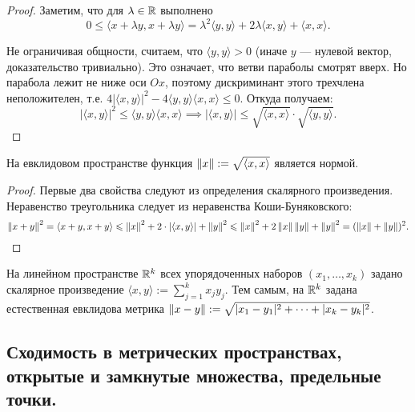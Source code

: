 \documentclass[a4paper]{article}
\theoremstyle{named}
\begin{document}
    \begin{proof}
        Заметим, что для $\lambda \in \mathbb{R}$ выполнено
        \begin{equation*}
            0 \leq \langle x + \lambda y, x + \lambda y \rangle = \lambda^2 \langle y, y \rangle + 2\lambda \langle x, y \rangle + \langle x, x \rangle.
        \end{equation*}

        Не ограничивая общности, считаем, что $\langle y, y \rangle > 0$ (иначе $y$ --- нулевой вектор, доказательство тривиально). Это означает, что ветви параболы смотрят вверх. Но парабола лежит не ниже оси $Ox$, поэтому дискриминант этого трехчлена неположителен, т.е. $4|\langle x, y \rangle|^2 - 4\langle y, y \rangle \langle x, x \rangle \leq 0$. Откуда получаем:
        \begin{equation*}
            |\langle x, y \rangle|^2 \leq \langle y, y \rangle \langle x, x \rangle \implies |\langle x, y \rangle| \leq \sqrt{\langle x, x \rangle} \cdot \sqrt{\langle y, y \rangle}.
        \end{equation*}
    \end{proof}

    \begin{consequence*}
        На евклидовом пространстве функция $\left\lVert x\right\rVert := \sqrt{\langle x, x \rangle}$ является нормой.
    \end{consequence*}

    \begin{proof}
        Первые два свойства следуют из определения скалярного произведения. Неравенство треугольника следует из неравенства Коши-Буняковского:
        \begin{equation*}
            \left\lVert x + y\right\rVert^2 = \langle x + y, x + y \rangle \leqslant \left\lVert x\right\rVert^2 + 2 \cdot |\langle x, y \rangle| + \left\lVert y\right\rVert^2 \leqslant \left\lVert x\right\rVert^2 + 2\left\lVert x\right\rVert\left\lVert y\right\rVert + \left\lVert y\right\rVert^2 = (\left\lVert x\right\rVert + \left\lVert y\right\rVert)^2.
        \end{equation*}
    \end{proof}

    \begin{example*}
        На линейном пространстве $\mathbb{R}^k$ всех упорядоченных наборов $(x_1, \dots, x_k)$ задано скалярное произведение $\langle x, y \rangle := \sum_{j = 1}^k x_jy_j$. Тем самым, на $\mathbb{R}^k$ задана естественная евклидова метрика $\left\lVert x - y\right\rVert := \sqrt{|x_1 - y_1|^2 + \dots + |x_k - y_k|^2}$.
    \end{example*}

    \subsection{Сходимость в метрических пространствах, открытые и замкнутые множества, предельные точки.}
\end{document}
